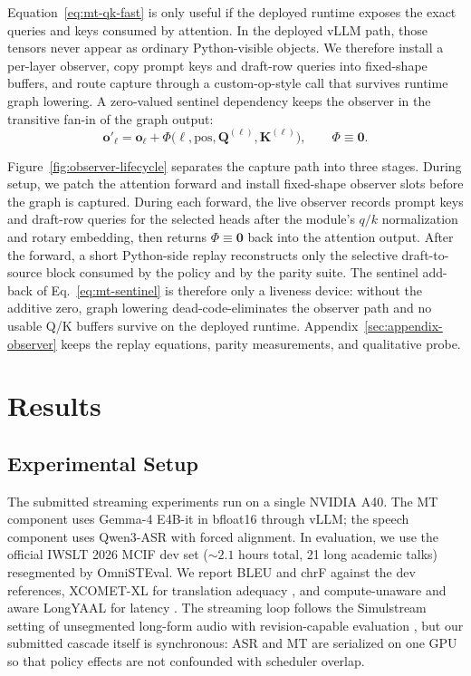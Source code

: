 \documentclass[11pt]{article}
\begin{document}
Equation~\eqref{eq:mt-qk-fast} is only useful if the deployed runtime exposes
the exact queries and keys consumed by attention. In the deployed vLLM path,
those tensors never appear as ordinary Python-visible objects. We therefore
install a per-layer observer, copy prompt keys and draft-row queries into
fixed-shape buffers, and route capture through a custom-op-style call that
survives runtime graph lowering. A zero-valued sentinel
dependency keeps the observer in the transitive fan-in of the graph output:
\begin{equation}
  \mathbf{o}'_\ell =
  \mathbf{o}_\ell +
  \Phi\bigl(\ell,\mathrm{pos},\mathbf{Q}^{(\ell)},\mathbf{K}^{(\ell)}\bigr),
  \qquad \Phi \equiv \mathbf{0}.
  \label{eq:mt-sentinel}
\end{equation}



Figure~\ref{fig:observer-lifecycle} separates the capture path into three
stages. During setup, we patch the attention forward and install fixed-shape
observer slots before the graph is captured. During each forward, the live
observer records prompt keys and draft-row queries for the selected heads after
the module's $q/k$ normalization and rotary embedding, then returns
$\Phi \equiv \mathbf{0}$ back into the attention output. After the forward, a
short Python-side replay reconstructs only the selective
draft-to-source block consumed by the policy and by the parity suite. The
sentinel add-back of Eq.~\eqref{eq:mt-sentinel} is therefore only a liveness
device: without the additive zero, graph lowering dead-code-eliminates the
observer path and no usable Q/K buffers survive on the deployed runtime.
Appendix~\ref{sec:appendix-observer} keeps the replay equations, parity
measurements, and qualitative probe.

\section{Results}
\label{sec:results}

\subsection{Experimental Setup}
\label{sec:setup}

The submitted streaming experiments run on a single NVIDIA A40. The MT component uses Gemma-4 E4B-it
in bfloat16 through vLLM; the speech component uses Qwen3-ASR with
forced alignment. In evaluation, we use the official IWSLT 2026 MCIF dev set
($\sim 2.1$ hours total, 21 long academic talks) resegmented by OmniSTEval.
We report BLEU and chrF against the dev references, XCOMET-XL for
translation adequacy \citep{xcometxl24}, and compute-unaware and aware
LongYAAL for latency \citep{longyaal25}. The streaming loop follows the
Simulstream setting of unsegmented long-form audio with revision-capable
evaluation \citep{simulstream25}, but our submitted cascade itself is
synchronous: ASR and MT are serialized on one GPU so that policy effects are
not confounded with scheduler overlap.
\end{document}
